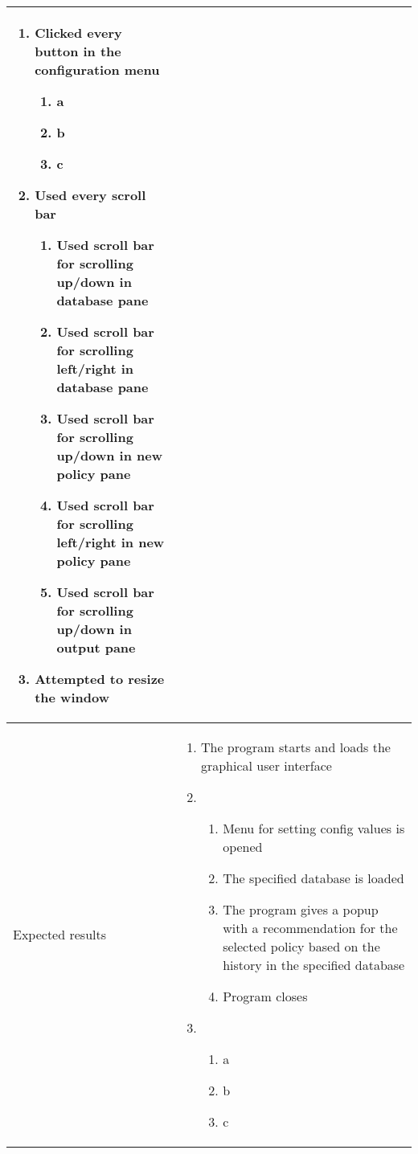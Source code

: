 \documentclass[10pt]{article}
\begin{document}
\begin{center}
\begin{longtable}{ | p{4cm} | p{10cm} | }
\begin{enumerate}
							\item Clicked every button in the configuration menu
							\begin{enumerate}
								\item a
								\item b
								\item c
							\end{enumerate}

							\item Used every scroll bar
							\begin{enumerate}
								\item Used scroll bar for scrolling up/down in database pane
								\item Used scroll bar for scrolling left/right in database pane
								\item Used scroll bar for scrolling up/down in new policy pane
								\item Used scroll bar for scrolling left/right in new policy pane
								\item Used scroll bar for scrolling up/down in output pane
							\end{enumerate}

							\item Attempted to resize the window
						\end{enumerate} \\ [3pt] \hline
			
			Expected results &	\begin{enumerate}
							\item The program starts and loads the graphical user interface

							\item  
							\begin{enumerate}
								\item Menu for setting config values is opened
								\item The specified database is loaded
								\item The program gives a popup with a recommendation for the selected policy based on the history in the specified database
								\item Program closes
							\end{enumerate}
							
							\item
							\begin{enumerate}
								\item a
								\item b
								\item c
							\end{enumerate}


\end{enumerate}
\end{longtable}
\end{center}
\end{document}
